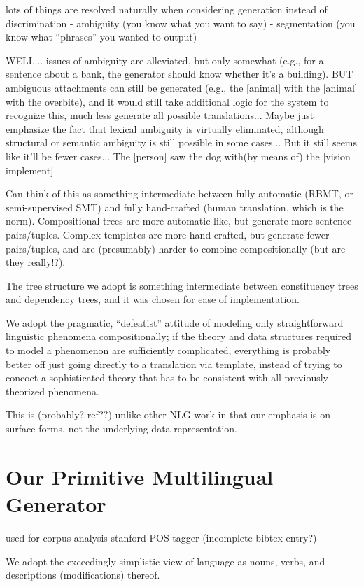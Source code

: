 lots of things are resolved naturally when considering generation instead of discrimination
- ambiguity (you know what you want to say)
- segmentation (you know what ``phrases'' you wanted to output)

WELL... issues of ambiguity are alleviated, but only somewhat (e.g., for a sentence about a bank, the generator should know whether it's a building). 
BUT ambiguous attachments can still be generated (e.g., the [animal] with the [animal] with the overbite), and it would still take additional logic for the system to recognize this, much less generate all possible translations...
Maybe just emphasize the fact that lexical ambiguity is virtually eliminated, although structural or semantic ambiguity is still possible in some cases...
But it still seems like it'll be fewer cases... The [person] saw the dog with(by means of) the [vision implement]


Can think of this as something intermediate between fully automatic (RBMT, or semi-supervised SMT) and fully hand-crafted (human translation, which is the norm).
Compositional trees are more automatic-like, but generate more sentence pairs/tuples.
Complex templates are more hand-crafted, but generate fewer pairs/tuples, and are (presumably) harder to combine compositionally (but are they really!?).

The tree structure we adopt is something intermediate between constituency trees and dependency trees, and it was chosen for ease of implementation.

We adopt the pragmatic, ``defeatist'' attitude of modeling only straightforward linguistic phenomena compositionally; if the theory and data structures required to model a phenomenon are sufficiently complicated, everything is probably better off just going directly to a translation via template, instead of trying to concoct a sophisticated theory that has to be consistent with all previously theorized phenomena.

This is (probably? ref??) unlike other NLG work in that our emphasis is on surface forms, not the underlying data representation.


\section{Our Primitive Multilingual Generator}

used for corpus analysis stanford POS tagger (incomplete bibtex entry?) 

We adopt the exceedingly simplistic view of language as nouns, verbs, and descriptions (modifications) thereof.

